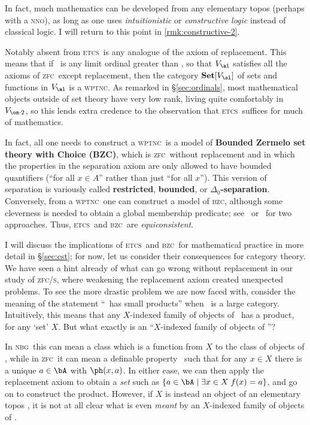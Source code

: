 \documentclass{amsart}
\newcommand{\Set}{\ensuremath{\mathbf{Set}}}
\def\zfc{\textsc{zfc}}
\def\zfcs{\textsc{zfc/s}}
\def\nbg{\textsc{nbg}}
\def\wptnc{\textsc{wptnc}}
\def\etcs{\textsc{etcs}}
\def\bzc{\textsc{bzc}}
\def\nno{\textsc{nno}}
\begin{document}
\begin{rmk}\label{rmk:constructive-1}
  In fact, much mathematics can be developed from any elementary topos
  (perhaps with a \nno), as long as one uses \emph{intuitionistic} or
  \emph{constructive logic} instead of classical logic.  I will return
  to this point in \autoref{rmk:constructive-2}.
\end{rmk}

Notably absent from \etcs\ is any analogue of the axiom of
replacement.  This means that if \al\ is any limit ordinal greater
than \om, so that $V_\al$ satisfies all the axioms of \zfc\ except
replacement, then the category $\Set[V_\al]$ of sets and functions in
$V_\al$ is a \wptnc.  As remarked in \S\ref{sec:ordinals}, most
mathematical objects outside of set theory have very low rank, living
quite comfortably in $V_{\om\cdot 2}$, so this lends extra credence to
the observation that \etcs\ suffices for much of mathematics.

In fact, all one needs to construct a \wptnc\ is a model of
\textbf{Bounded Zermelo set theory with Choice (BZC)}, which is \zfc\
without replacement and in which the properties in the separation
axiom are only allowed to have bounded quantifiers (``for all $x\in
A$'' rather than just ``for all $x$'').  This version of separation is
variously called \textbf{restricted}, \textbf{bounded}, or
\textbf{$\Delta_0$-separation}.  Conversely, from a \wptnc\ one can
construct a model of \bzc, although some cleverness is needed to
obtain a global membership predicate; see~\cite[VI.10]{mm:shv-gl}
or~\cite[Ch.~9]{ptj:topos-theory} for two approaches.  Thus, \etcs\
and \bzc\ are \emph{equiconsistent}.

I will discuss the implications of \etcs\ and \bzc\ for mathematical
practice in more detail in \S\ref{sec:cst}; for now, let us consider
their consequences for category theory.  We have seen a hint already
of what can go wrong without replacement in our study of \zfcs, where
weakening the replacement axiom created unexpected problems.  To see
the more drastic problem we are now faced with, consider the meaning
of the statement ``\bA\ has small products'' when \bA\ is a large
category.  Intuitively, this means that any $X$-indexed family of
objects of \bA\ has a product, for any `set' $X$.  But what exactly is
an ``$X$-indexed family of objects of \bA''?

In \nbg\ this can mean a class which is a function from $X$ to the
class of objects of \bA, while in \zfc\ it can mean a definable
property \ph\ such that for any $x\in X$ there is a unique $a\in \bA$
with $\ph(x,a)$.  In either case, we can then apply the replacement
axiom to obtain a \emph{set} such as $\{a\in \bA \mid \exists x\in X\;
f(x)=a\}$, and go on to construct the product.  However, if $X$ is
instead an object of an elementary topos \bS, it is not at all clear
what is even \emph{meant} by an $X$-indexed family of objects of \bA.
\end{document}
